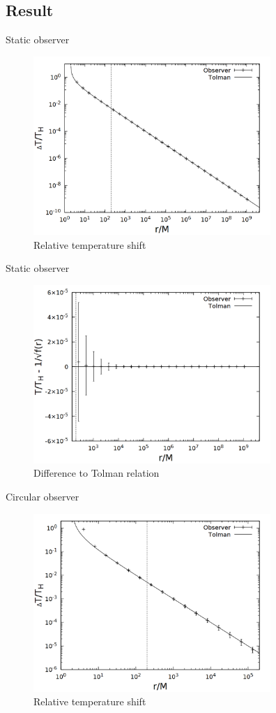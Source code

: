 \documentclass{beamer}
\begin{document}
\subsection{Result}
\begin{frame}{Static observer}
\begin{figure}
	\centering
    \includegraphics[width=9cm]{../cpp/final/stat.png}
    \caption{Relative temperature shift}
\end{figure}
\end{frame}

\begin{frame}{Static observer}
\begin{figure}
	\centering
    \includegraphics[width=9cm]{../cpp/final/stat_tolman.png}
    \caption{Difference to Tolman relation}
\end{figure}
\end{frame}

\begin{frame}{Circular observer}
\begin{figure}
	\centering
    \includegraphics[width=9cm]{../cpp/final/circ.png}
    \caption{Relative temperature shift}
\end{figure}
\end{frame}
\end{document}
